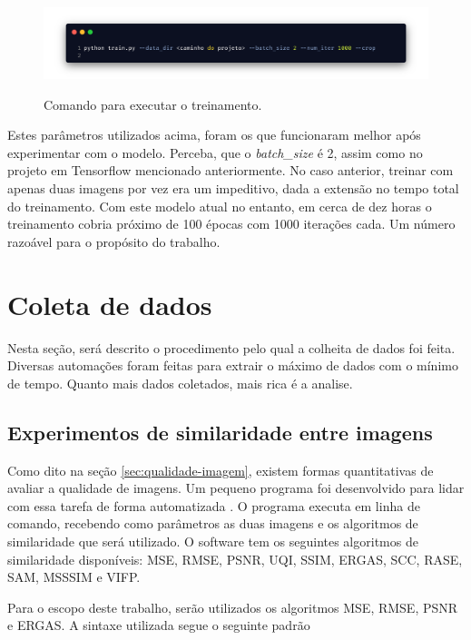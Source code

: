 \begin{figure}[H]
    \centering
    \caption{Comando para executar o treinamento.}
    \includegraphics[width=12cm]{fig/carbon_executar_projeto.png}
    \label{fig:fig30}
\end{figure}

Estes parâmetros utilizados acima, foram os que funcionaram melhor após experimentar com o modelo. Perceba, que o \textit{batch\_size} é 2, assim como no projeto em Tensorflow mencionado anteriormente. No caso anterior, treinar com apenas duas imagens por vez era um impeditivo, dada a extensão no tempo total do treinamento. Com este modelo atual no entanto, em cerca de dez horas o treinamento cobria próximo de 100 épocas com 1000 iterações cada. Um número razoável para o propósito do trabalho. 


\section{Coleta de dados}

Nesta seção, será descrito o procedimento pelo qual a colheita de dados foi feita. Diversas automações foram feitas para extrair o máximo de dados com o mínimo de tempo. Quanto mais dados coletados, mais rica é a analise.

\subsection{Experimentos de similaridade entre imagens}
\label{sec:experimentos-similaridade-imagens}

Como dito na seção \ref{sec:qualidade-imagem}, existem formas quantitativas de avaliar a qualidade de imagens. Um pequeno programa foi desenvolvido para lidar com essa tarefa de forma automatizada \cite{vasconcelos_leonamtvimage-similarity-scripts_2023}. O programa executa em linha de comando, recebendo como parâmetros as duas imagens e os algoritmos de similaridade que será utilizado. O software tem os seguintes algoritmos de similaridade disponíveis: MSE, RMSE, PSNR, UQI, SSIM, ERGAS, SCC, RASE, SAM, MSSSIM e VIFP.

Para o escopo deste trabalho, serão utilizados os algoritmos MSE, RMSE, PSNR e ERGAS. A sintaxe utilizada segue o seguinte padrão

